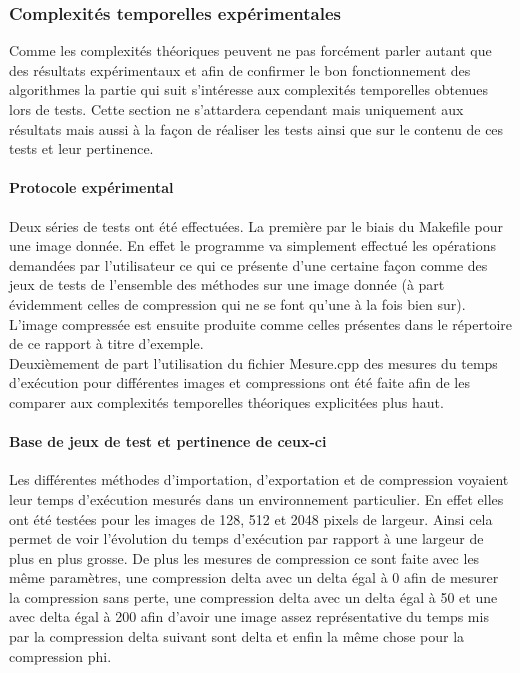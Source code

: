 \documentclass{article}
\begin{document}
	\subsubsection{Complexités temporelles expérimentales}
	
	Comme les complexités théoriques peuvent ne pas forcément parler autant que des résultats expérimentaux et afin de confirmer le bon fonctionnement des algorithmes la partie qui suit s'intéresse aux complexités temporelles obtenues lors de tests. Cette section ne s'attardera cependant mais uniquement aux résultats mais aussi à la façon de réaliser les tests ainsi que sur le contenu de ces tests et leur pertinence.
	
	\paragraph{Protocole expérimental}
	
	Deux séries de tests ont été effectuées. La première par le biais du Makefile pour une image donnée. En effet le programme va simplement effectué les opérations demandées par l'utilisateur ce qui ce présente d'une certaine façon comme des jeux de tests de l'ensemble des méthodes sur une image donnée (à part évidemment celles de compression qui ne se font qu'une à la fois bien sur). L'image compressée est ensuite produite comme celles présentes dans le répertoire de ce rapport à titre d'exemple.\\
	Deuxièmement de part l'utilisation du fichier Mesure.cpp des mesures du temps d'exécution pour différentes images et compressions ont été faite afin de les comparer aux complexités temporelles théoriques explicitées plus haut.
	
	\paragraph{Base de jeux de test et pertinence de ceux-ci}
	
	Les différentes méthodes d'importation, d'exportation et de compression voyaient leur temps d'exécution mesurés dans un environnement particulier. En effet elles ont été testées pour les images de 128, 512 et 2048 pixels de largeur. Ainsi cela permet de voir l'évolution du temps d'exécution par rapport à une largeur de plus en plus grosse. De plus les mesures de compression ce sont faite avec les même paramètres, une compression delta avec un delta égal à 0 afin de mesurer la compression sans perte, une compression delta avec un delta égal à 50 et une avec delta égal à 200 afin d'avoir une image assez représentative du temps mis par la compression delta suivant sont delta et enfin la même chose pour la compression phi.
	
\end{document}
